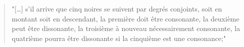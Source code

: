 \begin{quotation}
    "[\dots] s'il arrive que cinq noires se suivent par degrés conjoints, soit en montant soit en descendant, la première doit être consonante, la deuxième peut être dissonante, la troisième à nouveau nécessairement consonante, la quatrième pourra être dissonante si la cinquième est une consonance;"
    \label{appen:cinqnoires}
\end{quotation}

